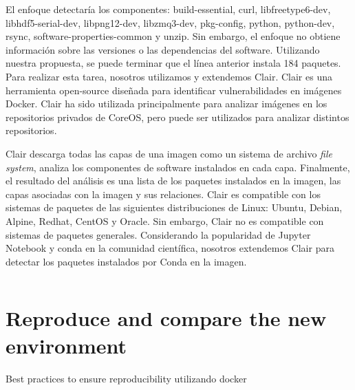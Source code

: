 El enfoque detectaría los componentes: build-essential, curl, libfreetype6-dev, libhdf5-serial-dev, libpng12-dev, libzmq3-dev, pkg-config, python, python-dev, rsync, software-properties-common y unzip. Sin embargo, el enfoque no obtiene información sobre las versiones o las dependencias del software. Utilizando nuestra propuesta, se puede terminar que el línea anterior instala 184 paquetes.
Para realizar esta tarea, nosotros utilizamos y extendemos Clair. Clair es una herramienta open-source diseñada para identificar vulnerabilidades en imágenes Docker. Clair ha sido utilizada principalmente para analizar imágenes en los repositorios privados de CoreOS, pero puede ser utilizados para analizar distintos repositorios.

Clair descarga todas las capas de una imagen como un sistema de archivo \textit{file system}, analiza los componentes de software instalados en cada capa. 
Finalmente, el resultado del análisis es una lista de los paquetes instalados en la imagen, las capas asociadas con la imagen y sus relaciones.
Clair es compatible con los sistemas de paquetes de las siguientes distribuciones de Linux: Ubuntu, Debian, Alpine, Redhat, CentOS y Oracle. Sin embargo, Clair no es compatible con sistemas de paquetes generales.
Considerando la popularidad de Jupyter Notebook y conda en la comunidad científica, nosotros extendemos Clair para detectar los paquetes instalados por Conda en la imagen.


\begin{lstlisting}
\end{lstlisting}

\section{Reproduce and compare the new environment}\label{s4.3}







\todo[inline] Best practices to ensure reproducibility utilizando docker
